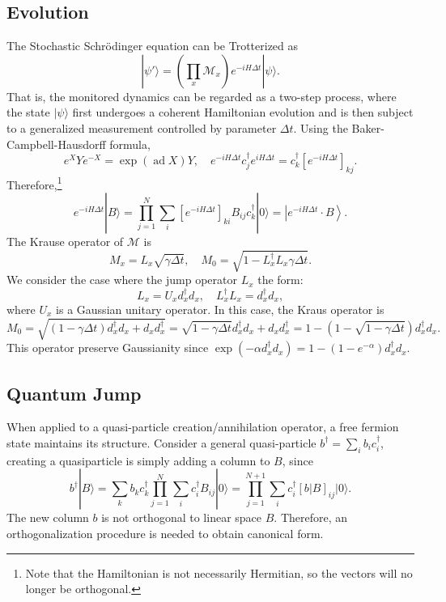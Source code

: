 \documentclass{SciPost}
\begin{document}
\subsection{Evolution}

The Stochastic Schr\"odinger equation can be Trotterized as
\begin{equation}
	|\psi'\rangle = \left(\prod_x \mathcal{M}_x \right) e^{-iH \Delta t} |\psi\rangle.
\end{equation}
That is, the monitored dynamics can be regarded as a two-step process, where the state $|\psi\rangle$ first undergoes a coherent Hamiltonian evolution and is then subject to a generalized measurement controlled by parameter $\Delta t$.
Using the Baker-Campbell-Hausdorff formula, 
\begin{equation*}
	e^X Y e^{-X} = \exp(\operatorname{ad} X) Y,\quad
	e^{-iH \Delta t} c_j^\dagger e^{iH \Delta t} = c_k^\dagger[e^{-iH \Delta t}]_{kj}.
\end{equation*}
Therefore,\footnote{Note that the Hamiltonian is not necessarily Hermitian, so the vectors will no longer be orthogonal.}
\begin{equation}
	e^{-iH \Delta t}|B\rangle = \prod_{j=1}^N \sum_i \left[e^{-iH \Delta t}\right]_{ki} B_{ij} c_{k}^\dagger |0\rangle = \left|e^{-iH \Delta t}\cdot B \right\rangle.
\end{equation}
The Krause operator of $\mathcal M$ is
\begin{equation}
	M_x = L_x \sqrt{\gamma \Delta t},\quad
	M_0 = \sqrt{1-L_x^\dagger L_x \gamma \Delta t}.
\end{equation}
We consider the case where the jump operator $L_x$ the form:
\begin{equation}
	L_x = U_x d_x^\dagger d_x,\quad
	L_x^\dagger L_x = d_x^\dagger d_x,
\end{equation}
where $U_x$ is a Gaussian unitary operator. In this case, the Kraus operator is 
\begin{equation*}
	M_0 = \sqrt{(1-\gamma\Delta t)d_x^\dagger d_x + d_x d_x^\dagger} 
	= \sqrt{1-\gamma\Delta t} d_x^\dagger d_x + d_x d_x^\dagger
	= 1 - \left(1-\sqrt{1-\gamma\Delta t}\right) d_x^\dagger d_x.
\end{equation*}
This operator preserve Gaussianity since $\exp(-\alpha d_x^\dagger d_x) = 1 - (1-e^{-\alpha})d_x^\dagger d_x$. 

\subsection{Quantum Jump}
When applied to a quasi-particle creation/annihilation operator, a free fermion state maintains its structure. Consider a general quasi-particle $b^\dagger = \sum_i b_i c_i^\dagger$, creating a quasiparticle is simply adding a column to $B$, since
\begin{equation}
	b^\dagger|B\rangle = \sum_k b_k c^\dagger_k \prod_{j=1}^N \sum_i c_i^\dagger B_{ij} |0\rangle
	= \prod_{j=1}^{N+1} \sum_i c_i^\dagger \left[b|B\right]_{ij} |0\rangle.
\end{equation}
The new column $b$ is not orthogonal to linear space $B$. Therefore, an orthogonalization procedure is needed to obtain canonical form.
\end{document}
